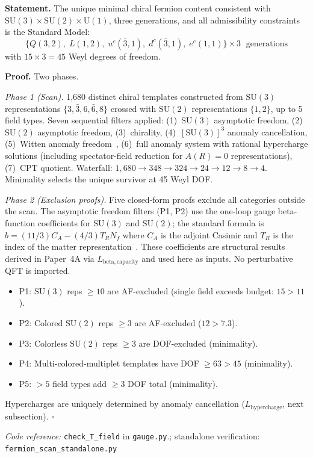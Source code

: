 \documentclass[11pt]{article}
\newenvironment{varlist}{\begin{itemize}[nosep,leftmargin=2em]}{\end{itemize}}
\newcommand{\coderef}[2]{\smallskip\noindent\textit{Code reference:} \texttt{#1} in \texttt{#2}.}
\newcommand{\SU}{\mathrm{SU}}
\newcommand{\U}{\mathrm{U}}
\begin{document}
\begin{tcolorbox}[apfbox, title={Theorem $T_{\mathrm{field}}$ (SM Fermion Content)}]
\textbf{Statement.}  The unique minimal chiral fermion content consistent with $\SU(3) \times \SU(2) \times \U(1)$, three generations, and all admissibility constraints is the Standard Model:
\begin{equation}
\{Q(3,2),\; L(1,2),\; u^c(\bar{3},1),\; d^c(\bar{3},1),\; e^c(1,1)\} \times 3 \;\text{ generations}
\label{eq:fermion_content}
\end{equation}
with $15 \times 3 = 45$ Weyl degrees of freedom.

\smallskip\noindent\textbf{Proof.}  Two phases.

\textit{Phase 1 (Scan).}  1{,}680 distinct chiral templates constructed from $\SU(3)$ representations $\{3, \bar{3}, 6, \bar{6}, 8\}$ crossed with $\SU(2)$ representations $\{1, 2\}$, up to 5 field types.  Seven sequential filters applied: (1)~$\SU(3)$ asymptotic freedom, (2)~$\SU(2)$ asymptotic freedom, (3)~chirality, (4)~$[\SU(3)]^3$ anomaly cancellation, (5)~Witten anomaly freedom~\cite{Witten1982}, (6)~full anomaly system with rational hypercharge solutions (including spectator-field reduction for $A(R)=0$ representations), (7)~CPT quotient.  Waterfall: $1{,}680 \to 348 \to 324 \to 24 \to 12 \to 8 \to 4$.  Minimality selects the unique survivor at 45 Weyl DOF.

\textit{Phase 2 (Exclusion proofs).}  Five closed-form proofs exclude all categories outside the scan.  The asymptotic freedom filters (P1, P2) use the one-loop gauge beta-function coefficients for $\SU(3)$ and $\SU(2)$; the standard formula is $b = (11/3)C_A - (4/3)T_R N_f$ where $C_A$ is the adjoint Casimir and $T_R$ is the index of the matter representation~\cite{PeskinSchroeder1995}.  These coefficients are structural results derived in Paper~4A via $L_{\mathrm{beta,capacity}}$ and used here as inputs.  No perturbative QFT is imported.
\begin{varlist}
\item P1: $\SU(3)$ reps $\ge 10$ are AF-excluded (single field exceeds budget: $15 > 11$).
\item P2: Colored $\SU(2)$ reps $\ge 3$ are AF-excluded ($12 > 7.3$).
\item P3: Colorless $\SU(2)$ reps $\ge 3$ are DOF-excluded (minimality).
\item P4: Multi-colored-multiplet templates have DOF $\ge 63 > 45$ (minimality).
\item P5: $> 5$ field types add $\ge 3$ DOF total (minimality).
\end{varlist}

Hypercharges are uniquely determined by anomaly cancellation ($L_{\mathrm{hypercharge}}$, next subsection).  $\square$

\coderef{check\_T\_field}{gauge.py}; standalone verification: \texttt{fermion\_scan\_standalone.py}~\cite{BrookeFermionScan}
\end{tcolorbox}
\end{document}
